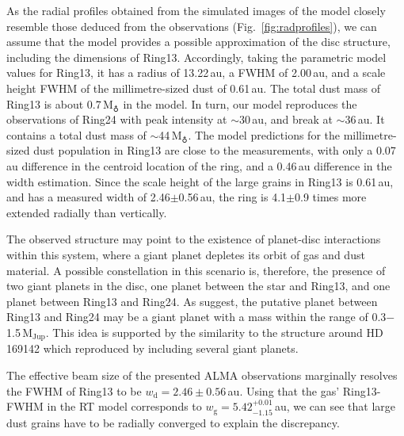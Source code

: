 \documentclass[fleqn,usenatbib,useAMS]{mnras}
\begin{document}
As the radial profiles obtained from the simulated images of the model closely resemble those deduced from the observations (Fig.~\ref{fig:radprofiles}), we can assume that the model provides a possible approximation of the disc structure, including the dimensions of Ring13. Accordingly, taking the parametric model values for Ring13, it has a radius of 13.22\,au, a FWHM of 2.00\,au, and a scale height FWHM of the millimetre-sized dust of 0.61\,au. The total dust mass of Ring13 is about 0.7\,M$_{\earth}$ in the model. In turn, our model reproduces the observations of Ring24 with peak intensity at $\sim$30\,au, and break at $\sim$36\,au. It contains a total dust mass of $\sim$44\,M$_{\earth}$. The model predictions for the millimetre-sized dust population in Ring13 are close to the measurements, with only a 0.07\,au difference in the centroid location of the ring, and a 0.46\,au difference in the width estimation. Since the scale height of the large grains in Ring13 is 0.61\,au, and has a measured width of 2.46$\pm$0.56\,au, the ring is 4.1$\pm$0.9 times more extended radially than vertically.

The observed structure may point to the existence of planet-disc interactions within this system, where a giant planet depletes its orbit of gas and dust material. A possible  constellation in this scenario is, therefore, the presence of two giant planets in the disc, one planet between the star and Ring13, and one planet between Ring13 and Ring24. As \citet{Ru_z_Rodr_guez_2019} suggest, the putative planet between Ring13 and Ring24 may be a giant planet with a mass within the range of 0.3$-$1.5\,$\mathrm{M}_{\mathrm{Jup}}$. This idea is supported by the similarity to the structure around HD\,169142 which \citet{2020arXiv200711565B} reproduced by including several giant planets. 

The effective beam size of the presented ALMA observations marginally resolves the FWHM of Ring13 to be $w_\mathrm{d} = 2.46\pm0.56$\,au. Using that the gas' Ring13-FWHM in the RT model corresponds to $w_\mathrm{g} = 5.42^{+0.01}_{-1.15}$\,au, we can see that large dust grains have to be radially converged to explain the discrepancy.
\end{document}
